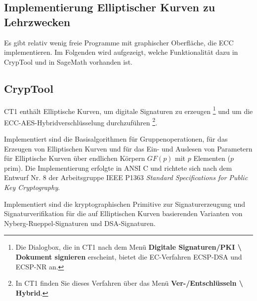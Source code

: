 \begin{refsegment}
\newpage
\section{Implementierung Elliptischer Kurven zu Lehrzwecken}
\label{ec:Implementing-for-Education}

Es gibt relativ wenig freie Programme mit graphischer Oberfläche, die ECC implementieren.
Im Folgenden wird aufgezeigt, welche Funktionalität dazu in CrypTool und in SageMath vorhanden ist.


\subsection{CrypTool}

CT1 enthält Elliptische Kurven, um digitale Signaturen zu erzeugen%
\footnote{%
Die Dialogbox, die in CT1 nach dem Menü
{\bf Digitale Signaturen/PKI \textbackslash{} Dokument signieren} erscheint,
bietet die EC-Verfahren ECSP-DSA und ECSP-NR an.

} und um die ECC-AES-Hybridverschlüsselung durchzuführen%
\footnote{%
In CT1 finden Sie dieses Verfahren über das Menü
{\bf Ver-/Entschlüsseln \textbackslash{} Hybrid}.

}.

Implementiert sind die Basisalgorithmen für Gruppenoperationen, für das
Erzeugen von Elliptischen Kurven und für das Ein- und Auslesen von
Parametern für Elliptische Kurven über endlichen Körpern $GF(p)$
mit $p$ Elementen ($p$ prim). Die Implementierung erfolgte in
ANSI C und richtete sich nach dem Entwurf Nr. 8 der Arbeitsgruppe
IEEE P1363 {\em Standard Specifications for Public Key Cryptography}.

Implementiert sind die kryptographischen Primitive zur Signaturerzeugung
und Signaturverifikation für die auf Elliptischen Kurven basierenden
Varianten von Nyberg-Rueppel-Signaturen und  DSA-Signaturen.


\end{refsegment}
